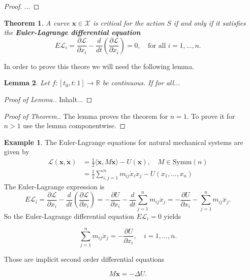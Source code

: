 \documentclass[hidelinks,a4paper, 11pt]{article}
\theoremstyle{plain}
\newtheorem{theorem}{Theorem}
\newtheorem{lemma}[theorem]{Lemma}
\theoremstyle{break}
\theoremstyle{plain}
\theoremstyle{definition}
\newtheorem*{example}{Example}
\begin{document}
{\begin{proof}
	...
\end{proof}

\begin{theorem}
	A curve $\mathbf x \in \mathcal X$ is critical for the action $S$ if and only if it satisfies the \textbf{Euler-Lagrange differential equation}
	\[
		E\mathcal L_i = \frac{\partial\mathcal L}{\partial x_i} - \frac{d}{dt}\left( \frac{\partial \mathcal L}{\partial \dot x_i} \right) = 0, \quad \text{for all }i = 1,...,n.
	\]
\end{theorem}

In order to prove this theore we will need the following lemma.

\begin{lemma}
	Let $f: [t_0,t:1] \to \mathbb R$ be continuous. If for all...
\end{lemma}

\begin{proof}[Proof of Lemma.]
	Inhalt...
\end{proof}

\begin{proof}[Proof of Theorem.]
	The lemma proves the theorem for $n=1$. To prove it for $n > 1$ use the lemma componentwise.
\end{proof}

\begin{example}
	The Euler-Lagrange equations for natural mechanical systems are given by 
	\begin{align*}
		\mathcal L(\mathbf x, \mathbf{\dot x}) &= \frac{1}{2} \langle \mathbf{\dot x}, M \mathbf{\dot x} \rangle - U(\mathbf x), \quad M \in \mathrm{Symm}(n) \\
		&= \frac{1}{2}\sum^n_{i,j=1}m_{ij}\dot x_i\dot x_j - U(x_1,...,x_n)
	\end{align*}
	The Euler-Lagrange expression is 
	\[
		E\mathcal L_i = \frac{\partial \mathcal L}{\partial x_i} - \frac{d}{dt}\left( \frac{\partial \mathcal L}{\partial \dot x_i} \right) = -\frac{\partial U}{\partial x_i} - \frac{d}{dt} \sum^n_{j=1} m_{ij}\dot x_j = -\frac{\partial U}{\partial x_i} - \sum^n_{j=1} m_{ij}\ddot x_j.
	\]
	So the Euler-Lagrange differential equation $E\mathcal L_i = 0$ yields
	\begin{framed}
	\[
		\sum^n_{j=1} m_{ij} \ddot x_j = -\frac{\partial U}{\partial x_i}, \quad i = 1,...,n.
	\]
	\end{framed}
	Those are implicit second order differential equations
	\begin{framed}
	\[
		M \mathbf{\ddot x} = - \Delta U.
	\]
	\end{framed}
\end{example}

}
\end{document}
